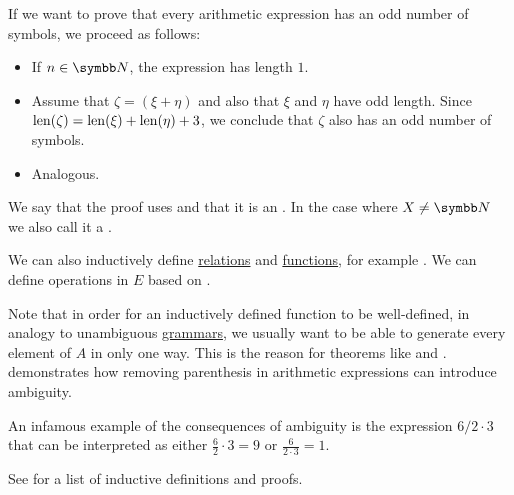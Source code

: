 \begin{remark}
  If we want to prove that every arithmetic expression has an odd number of symbols, we proceed as follows:
  \begin{itemize}
    \item If \( n \in \BN \), the expression has length \( 1 \).
    \item Assume that \( \zeta = (\xi + \eta) \) and also that \( \xi \) and \( \eta \) have odd length. Since \( \operatorname{len}(\zeta) = \operatorname{len}(\xi) + \operatorname{len}(\eta) + 3 \), we conclude that \( \zeta \) also has an odd number of symbols.
    \item Analogous.
  \end{itemize}

  We say that the proof uses  and that it is an . In the case where \( X \neq \BN \) we also call it a .

  We can also inductively define \hyperref[def:relation]{relations} and \hyperref[def:function]{functions}, for example . We can define operations in \( E \) based on .

  Note that in order for an inductively defined function to be well-defined, in analogy to unambiguous \hyperref[def:ambiguous_grammar]{grammars}, we usually want to be able to generate every element of \( A \) in only one way. This is the reason for theorems like  and .  demonstrates how removing parenthesis in arithmetic expressions can introduce ambiguity.

  An infamous example of the consequences of ambiguity is the expression \( 6 / 2 \cdot 3 \) that can be interpreted as either \( \tfrac 6 2 \cdot 3 = 9 \) or \( \tfrac 6 {2 \cdot 3} = 1 \).

  See  for a list of inductive definitions and proofs.
\end{remark}
